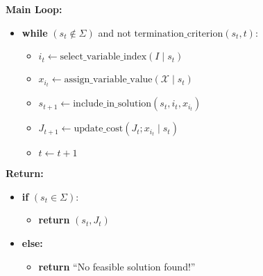 \begin{tcolorbox}[colback=white, colframe=black!25, title={\textbf{Procedure:} Construction\_Metaheuristic($\pi$)}]
\vspace{0.7em}
\textbf{Main Loop:}
\begin{itemize}[noitemsep, leftmargin=2em]
    \item \textbf{while} $(s_t \notin \Sigma)$ and not $\text{termination\_criterion}(s_t, t)$:
    \begin{itemize}[noitemsep, leftmargin=2em]
        \item $i_t \gets \text{select\_variable\_index}(I \mid s_t)$
        \item $x_{i_t} \gets \text{assign\_variable\_value}(\mathcal{X} \mid s_t)$
        \item $s_{t+1} \gets \text{include\_in\_solution}(s_t, i_t, x_{i_t})$
        \item $J_{t+1} \gets \text{update\_cost}(J_t; x_{i_t} \mid s_t)$
        \item $t \gets t + 1$
    \end{itemize}
\end{itemize}

\vspace{0.7em}
\textbf{Return:}
\begin{itemize}[noitemsep, leftmargin=2em]
    \item \textbf{if} $(s_t \in \Sigma)$:
    \begin{itemize}[noitemsep, leftmargin=2em]
        \item \textbf{return} $(s_t, J_t)$
    \end{itemize}
    \item \textbf{else:}
    \begin{itemize}[noitemsep, leftmargin=2em]
        \item \textbf{return} ``No feasible solution found!''
    \end{itemize}
\end{itemize}

\end{tcolorbox}
